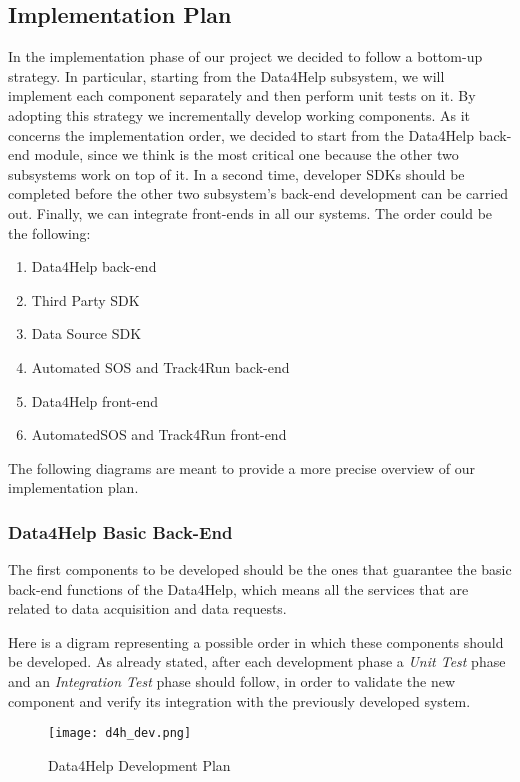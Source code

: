 \subsection{Implementation Plan}
In the implementation phase of our project we decided to follow a bottom-up strategy. In particular, starting from the Data4Help subsystem, we will implement each component separately and then perform unit tests on it. By adopting this strategy we incrementally develop working components.
As it concerns the implementation order, we decided to start from the Data4Help back-end module, since we think is the most critical one because the other two subsystems work on top of it.
In a second time, developer SDKs should be completed before the other two subsystem's back-end development can be carried out.
Finally, we can integrate front-ends in all our systems.
The order could be the following:

\begin{enumerate}
    \item Data4Help back-end
    \item Third Party SDK
    \item Data Source SDK
    \item Automated SOS and Track4Run back-end
    \item Data4Help front-end
    \item AutomatedSOS and Track4Run front-end
\end{enumerate}


The following diagrams are meant to provide a more precise overview of our implementation plan.

\subsubsection{Data4Help Basic Back-End}

The first components to be developed should be the ones that guarantee the basic back-end functions of the Data4Help, which means all the services that are related to data acquisition and data requests. 

Here is a digram representing a possible order in which these components should be developed. As already stated, after each development phase a \textit{Unit Test} phase and an \textit{Integration Test} phase should follow, in order to validate the new component and verify its integration with the previously developed system.

\FloatBarrier
\begin{figure}[!h]
	\centering
	\texttt{[image: d4h\_dev.png]}
	\caption{Data4Help Development Plan}
\end{figure}
\FloatBarrier

